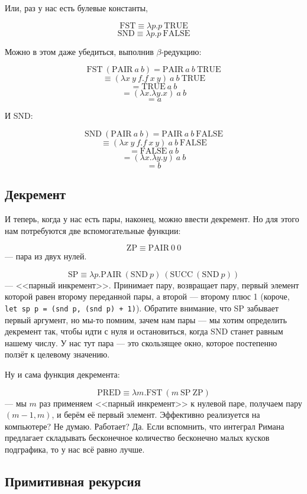 \documentclass{../../text-style}
\begin{document}
Или, раз у нас есть булевые константы,

$$\mbox{FST} \equiv \lambda p.p\ \mbox{TRUE}$$
$$\mbox{SND} \equiv \lambda p.p\ \mbox{FALSE}$$

Можно в этом даже убедиться, выполнив $\beta$-редукцию: 

$$\mbox{FST}\ (\mbox{PAIR}\ a\ b) = \mbox{PAIR}\ a\ b\ \mbox{TRUE}$$
$$\equiv (\lambda x\ y\ f.f\ x\ y)\ a\ b\ \mbox{TRUE}$$
$$= \mbox{TRUE}\ a\ b$$
$$= (\lambda x.\lambda y.x)\ a\ b$$
$$= a$$

И SND:

$$\mbox{SND}\ (\mbox{PAIR}\ a\ b) = \mbox{PAIR}\ a\ b\ \mbox{FALSE}$$
$$\equiv (\lambda x\ y\ f.f\ x\ y)\ a\ b\ \mbox{FALSE}$$
$$= \mbox{FALSE}\ a\ b$$
$$= (\lambda x.\lambda y.y)\ a\ b$$
$$= b$$

\subsection{Декремент}

И теперь, когда у нас есть пары, наконец, можно ввести декремент. Но для этого нам потребуются две вспомогательные функции:

$$\mbox{ZP} \equiv \mbox{PAIR}\ 0\ 0$$ 
--- пара из двух нулей.

$$\mbox{SP} \equiv \lambda p.\mbox{PAIR}\ (\mbox{SND}\ p)\ (\mbox{SUCC}\ (\mbox{SND}\ p))$$
--- <<парный инкремент>>. Принимает пару, возвращает пару, первый элемент которой равен второму переданной пары, а второй --- второму плюс 1 (короче, \texttt{let sp p = (snd p, (snd p) + 1)}). Обратите внимание, что SP забывает первый аргумент, но мы-то помним, зачем нам пары --- мы хотим определить декремент так, чтобы идти с нуля и остановиться, когда SND станет равным нашему числу. У нас тут пара --- это скользящее окно, которое постепенно ползёт к целевому значению.

Ну и сама функция декремента:

$$\mbox{PRED} \equiv \lambda m.\mbox{FST}\ (m\ \mbox{SP}\ \mbox{ZP})$$
--- мы $m$ раз применяем <<парный инкремент>> к нулевой паре, получаем пару $(m - 1, m)$, и берём её первый элемент. Эффективно реализуется на компьютере? Не думаю. Работает? Да. Если вспомнить, что интеграл Римана предлагает складывать бесконечное количество бесконечно малых кусков подграфика, то у нас всё равно лучше.

\subsection{Примитивная рекурсия}
\end{document}

